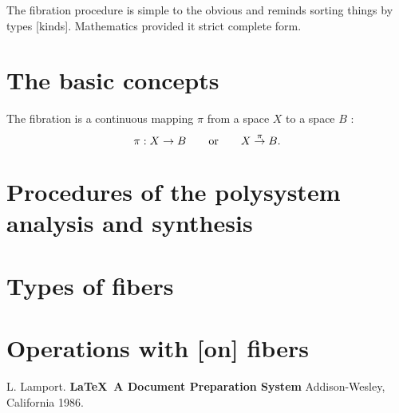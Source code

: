 \documentclass[12pt,leqno]{book}
\numberwithin{equation}{chapter}
\begin{document}
The fibration procedure is simple to the obvious and reminds sorting things by types [kinds]. Mathematics provided it strict complete form.

\section{The basic concepts}

The fibration is a continuous mapping $\pi{}$ from a space $X$ to a space $B$ \cite{b335}:
\begin{equation}
\pi{}:X\to{}B\qquad{}\text{or}\qquad{}X\overset{\small{}\pi}{\to} B. \label{f:1}
\end{equation}

\section{Procedures of the polysystem analysis and synthesis}
\section{Types of fibers}
\section{Operations with [on] fibers}

\pagestyle{headings}




\begin{thebibliography}{99}
 L. Lamport. {\bf \LaTeX \ A Document Preparation System}
Addison-Wesley, California 1986.
\end{thebibliography}
\listoffigures
\listoftables

\end{document}
